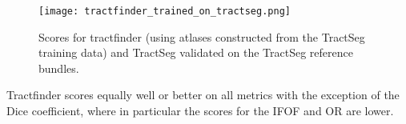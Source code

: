 \begin{figure}
  \texttt{[image: tractfinder\_trained\_on\_tractseg.png]}
  \caption{Scores for tractfinder (using atlases constructed from the TractSeg training data) and TractSeg validated on the TractSeg reference bundles.}
  \label{fig:ts_atlas}
\end{figure}

Tractfinder scores equally well or better on all metrics with the exception of the Dice coefficient, where in particular the scores for the IFOF and OR are lower.

